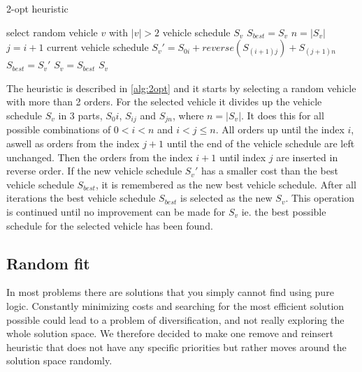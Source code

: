 \documentclass[../main.tex]{subfiles}
\begin{document}
\begin{algorithm}
    \caption{2-opt heuristic}\label{alg:2opt}
    \begin{algorithmic}[1]
        \State select random vehicle $v$ with $|v|>2$
        \State vehicle schedule $S_v$
        \Repeat
        \State $S_{best} = S_v$
        \State $n = |S_v|$
            \State $j=i+1$
                \State current vehicle schedule $S_v' = S_{0i} + reverse(S_{(i+1)j}) + S_{(j+1)n}$ 
                \State $S_{best} = S_v'$
                \EndIf
            \EndFor
        \EndFor
        \State $S_v = S_{best}$
        \State 
        \Return $S_v$
        \EndFunction
    \end{algorithmic}
\end{algorithm}


The heuristic is described in \cref{alg:2opt} and it starts by selecting a random vehicle with more than 2 orders.
For the selected vehicle it divides up the vehicle schedule $S_v$ in 3 parts, $S_0i$, $S_{ij}$ and $S_{jn}$, where $n=|S_v|$. It does this for all possible combinations of $0<i<n$ and $i<j\leq n$.
All orders up until the index $i$, aswell as orders from the index $j+1$ until the end of the vehicle schedule are left unchanged.
Then the orders from the index $i+1$ until index $j$ are inserted in reverse order.
If the new vehicle schedule $S_v'$ has a smaller cost than the best vehicle schedule $S_{best}$, it is remembered as the new best vehicle schedule. 
After all iterations the best vehicle schedule $S_{best}$ is selected as the new $S_v$.
This operation is continued until no improvement can be made for $S_v$ ie. the best possible schedule for the selected vehicle has been found.

\subsection{Random fit}
\label{sec:rand}
In most problems there are solutions that you simply cannot find using pure logic. 
Constantly minimizing costs and searching for the most efficient solution possible could lead to a problem of diversification, and not really exploring the whole solution space. 
We therefore decided to make one remove and reinsert heuristic that does not have any specific priorities but rather moves around the solution space randomly. 
\end{document}
